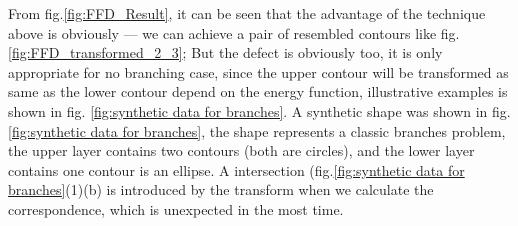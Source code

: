 \documentclass[3p,times]{elsarticle}
\begin{document}
From fig.\ref{fig:FFD_Result}, it can be seen that the advantage of
the technique above is obviously --- we can achieve a pair of resembled contours like
fig.\ref{fig:FFD_transformed_2_3}; But the defect is obviously too, it is
only appropriate for no branching case, since the upper contour will
be transformed as same as the lower contour depend on the energy
function, illustrative examples is shown in fig. \ref{fig:synthetic data for branches}. A synthetic shape was shown in
fig.\ref{fig:synthetic data for branches}, the shape represents a
classic branches problem, the upper layer contains two contours (both
are circles), and the lower layer contains one contour is an
ellipse. A intersection (fig.\ref{fig:synthetic data for branches}(1)(b) is
introduced by the transform when we calculate the correspondence,
which is unexpected in the most time. 
\end{document}
